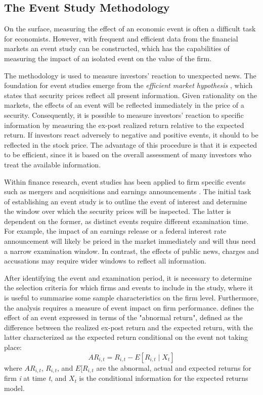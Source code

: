 \subsection{The Event Study Methodology}

On the surface, measuring the effect of an economic event is often a difficult task for economists. However, with frequent and efficient data from the financial markets an event study can be constructed, which has the capabilities of measuring the impact of an isolated event on the value of the firm. 



The methodology is used to measure investors' reaction to unexpected news. The foundation for event studies emerge from the \textit{efficient market hypothesis} \citep{fama1969_EMH}, which states that security prices reflect all present information. Given rationality on the markets, the effects of an event will be reflected immediately in the price of a security. Consequently, it is possible to measure investors' reaction to specific information by measuring the ex-post realized return relative to the expected return. If investors react adversely to negative and positive events, it should to be reflected in the stock price. The advantage of this procedure is that it is expected to be efficient, since it is based on the overall assessment of many investors who treat the available information. 

Within finance research, event studies has been applied to firm specific events such as mergers and acquisitions and earnings announcements \citep{Event_studies}. The initial task of establishing an event study is to outline the event of interest and determine the window over which the security prices will be inspected. The latter is dependent on the former, as distinct events require different examination time. For example, the impact of an earnings release or a federal interest rate announcement will likely be priced in the market immediately and will thus need a narrow examination window. In contrast, the effects of public news, charges and accusations may require wider windows to reflect all information. 

After identifying the event and examination period, it is necessary to determine the selection criteria for which firms and events to include in the study, where it is useful to summarise some sample characteristics on the firm level. Furthermore, the analysis requires a measure of event impact on firm performance. \cite{Event_studies} defines the effect of an event expressed in terms of the "abnormal return", defined as the difference between the realized ex-post return and the expected return, with the latter characterized as the expected return conditional on the event not taking place: 
\begin{equation}
    AR_{i,t} = R_{i,t} - E[R_{i,t} \mid X_t ]
\end{equation}
where $AR_{i,t}$, $R_{i,t}$, and $E[R_{i,t}$ are the abnormal, actual and expected returns for firm \textit{i} at time \textit{t}, and $X_t$ is the conditional information for the expected returns model. 

